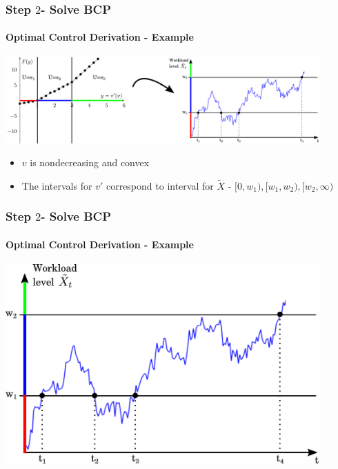 \documentclass{beamer}
\begin{document}
\begin{frame}
  \frametitle{Step $2$- Solve BCP}
  \framesubtitle{Optimal Control Derivation - Example}
  
  \begin{center}
    \includegraphics[width=0.9\textwidth]{pictures/p20WithAddition.pdf}
  \end{center}

  \vfill
  \begin{itemize}[<+->]
  \item $v$ is nondecreasing and convex 
    \vfill
  \item The intervals for $v'$ correspond to interval for $\tilde{X}$ - $[0,w_1),[w_1,w_2),[w_2,\infty)$
  \end{itemize}
  \vfill

\end{frame}

\begin{frame}
  \frametitle{Step $2$- Solve BCP}
  \framesubtitle{Optimal Control Derivation - Example}
  
  \begin{center}
    \includegraphics[width=0.9\textwidth]{pictures/p20.pdf}
  \end{center}

  \vfill  
  \onslide<+->{
    {\bf Ex.} Below $w_1$ ($[0,t_1)$, $[t_2,t_3)$,...): $U=e_1$ $\rightarrow$ least priority to class $1$.
      }
\end{frame}
\end{document}
